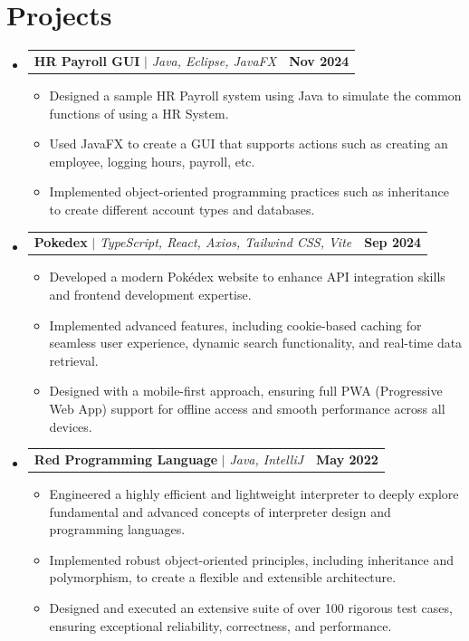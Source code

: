 \documentclass[letterpaper,11pt]{article}
\makeatletter
\newcommand{\resumeItem}[1]{
  \item\small{
    {#1 \vspace{-2pt}}
  }
}
\newcommand{\resumeProjectHeading}[2]{
    \item
    \begin{tabular*}{1.001\textwidth}{l@{\extracolsep{\fill}}r}
      \small#1 & \textbf{\small #2}\\
    \end{tabular*}\vspace{-7pt}
}
\newcommand{\resumeSubHeadingListStart}{\begin{itemize}[leftmargin=0.0in, label={}]}
\newcommand{\resumeSubHeadingListEnd}{\end{itemize}}
\newcommand{\resumeItemListStart}{\begin{itemize}}
\newcommand{\resumeItemListEnd}{\end{itemize}\vspace{-5pt}}
\makeatother
\begin{document}
\section{Projects}
    \vspace{-5pt}
    \resumeSubHeadingListStart
    \resumeProjectHeading
          {\textbf{HR Payroll GUI} $|$ \emph{Java, Eclipse, JavaFX}}{Nov 2024}
          \resumeItemListStart
            \resumeItem{Designed a sample HR Payroll system using Java to simulate the common functions of using a HR System.}
            \resumeItem{Used JavaFX to create a GUI that supports actions such as creating an employee, logging hours, payroll, etc.}
            \resumeItem{Implemented object-oriented programming practices such as inheritance to create different account types and databases.}
            \resumeItemListEnd
        \vspace{-13pt}
    \resumeProjectHeading
          {\textbf{Pokedex} $|$ \emph{TypeScript, React, Axios, Tailwind CSS, Vite}}{Sep 2024}
          \resumeItemListStart
            \resumeItem{Developed a modern Pokédex website to enhance API integration skills and frontend development expertise.}
            \resumeItem{Implemented advanced features, including cookie-based caching for seamless user experience, dynamic search functionality, and real-time data retrieval.}
            \resumeItem{Designed with a mobile-first approach, ensuring full PWA (Progressive Web App) support for offline access and smooth performance across all devices.}
          \resumeItemListEnd 
          \vspace{-13pt}
    \resumeProjectHeading
          {\textbf{Red Programming Language} $|$ \emph{Java, IntelliJ}}{May 2022}
          \resumeItemListStart
            \resumeItem{Engineered a highly efficient and lightweight interpreter to deeply explore fundamental and advanced concepts of interpreter design and programming languages.}
            \resumeItem{Implemented robust object-oriented principles, including inheritance and polymorphism, to create a flexible and extensible architecture.}
            \resumeItem{Designed and executed an extensive suite of over 100 rigorous test cases, ensuring exceptional reliability, correctness, and performance.}
          \resumeItemListEnd
          \vspace{-13pt}
    \resumeSubHeadingListEnd
\vspace{-10pt}


%
\end{document}
